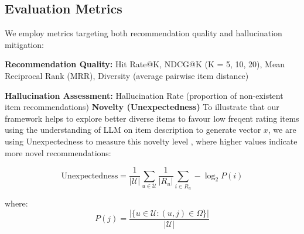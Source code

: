 \documentclass[acmsmall]{acmart}
\begin{document}



\subsection{Evaluation Metrics}
We employ metrics targeting both recommendation quality and hallucination mitigation:

\textbf{Recommendation Quality:} Hit Rate@K, NDCG@K (K = 5, 10, 20), Mean Reciprocal Rank (MRR), Diversity (average pairwise item distance) \cite{ricci_recommender_2022}

\textbf{Hallucination Assessment:} Hallucination Rate (proportion of non-existent item recommendations)
\textbf{Novelty (Unexpectedness)} To illustrate that our framework helps to explore better diverse items to favour low freqent rating items using the understanding of LLM on item description to generate vector $x$, we are using Unexpectedness to measure this novelty level \cite{ricci_recommender_2022}, where higher values indicate more novel recommendations:

\begin{equation}
\text{Unexpectedness} = \frac{1}{|\mathcal{U}|} \sum_{u \in \mathcal{U}} \frac{1}{|R_u|} \sum_{i \in R_u} -\log_2 P(i)
\label{eq:unexpectedness}
\end{equation}

where:
\begin{equation}
P(j) = \frac{|\{u \in \mathcal{U} : (u,j) \in \Omega\}|}{|\mathcal{U}|}
\label{eq:item_popularity}
\end{equation}
\end{document}
